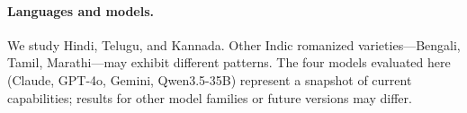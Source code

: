 \paragraph{Languages and models.}
We study Hindi, Telugu, and Kannada. Other Indic romanized varieties---Bengali,
Tamil, Marathi---may exhibit different patterns. The four models evaluated here
(Claude, GPT-4o, Gemini, Qwen3.5-35B) represent a snapshot of current capabilities; results for other model families or future versions may differ.
